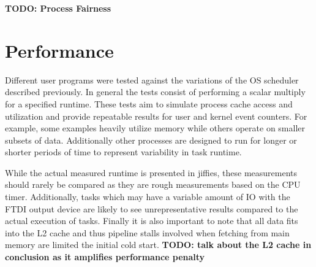 \documentclass[11pt]{article}
\begin{document}
\textbf{TODO: Process Fairness}


\section{Performance}
\label{sec:performance}
Different user programs were tested against the variations of the OS scheduler described previously.  In general the tests consist of performing a scalar multiply for a specified runtime.  These tests aim to simulate process cache access and utilization and provide repeatable results for user and kernel event counters.  For example, some examples heavily utilize memory while others operate on smaller subsets of data.  Additionally other processes are designed to run for longer or shorter periods of time to represent variability in task runtime.

While the actual measured runtime is presented in jiffies, these measurements should rarely be compared as they are rough measurements based on the CPU timer.  Additionally, tasks which may have a variable amount of IO with the FTDI output device are likely to see unrepresentative results compared to the actual execution of tasks.  Finally it is also important to note that all data fits into the L2 cache and thus pipeline stalls involved when fetching from main memory are limited the initial cold start.  \textbf{TODO: talk about the L2 cache in conclusion as it amplifies performance penalty}
\end{document}
